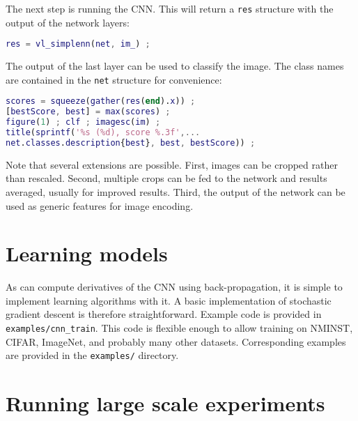 The next step is running the CNN. This will return a \verb!res! structure with the output of the network layers:
\begin{lstlisting}[language=Matlab]
% run the CNN
res = vl_simplenn(net, im_) ;
\end{lstlisting}

The output of the last layer can be used to classify the image. The class names are contained in the \verb!net! structure for convenience:
\begin{lstlisting}[language=Matlab]
% show the classification result
scores = squeeze(gather(res(end).x)) ;
[bestScore, best] = max(scores) ;
figure(1) ; clf ; imagesc(im) ;
title(sprintf('%s (%d), score %.3f',...
net.classes.description{best}, best, bestScore)) ;
\end{lstlisting}

Note that several extensions are possible. First, images can be cropped rather than rescaled. Second, multiple crops can be fed to the network and results averaged, usually for improved results. Third, the output of the network can be used as generic features for image encoding.

\section{Learning models}

As \matconvnet can compute derivatives of the CNN using back-propagation, it is simple to implement learning algorithms with it. A basic implementation of stochastic gradient descent is therefore straightforward. Example code is provided in \verb!examples/cnn_train!. This code is flexible enough to allow training on NMINST, CIFAR, ImageNet, and probably many other datasets. Corresponding examples are provided in the \verb!examples/! directory.

\section{Running large scale experiments}

